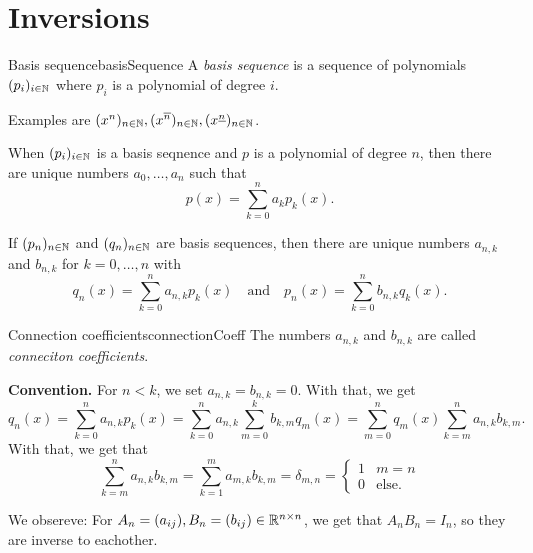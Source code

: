 \documentclass[language=english]{../../Template/TemplateLecture}
\begin{document}
\section{Inversions}
\begin{defi}{Basis sequence}{basisSequence}
    A \emph{basis sequence} is a sequence of polynomials $(p_i)_{i \in \mathbb{N}}$ where $p_i$ is a polynomial of degree $i$. 
\end{defi}

Examples are $(x^n)_{n \in \mathbb{N}}, (x^{\overline{n}})_{n \in \mathbb{N}}, (x^{\underline{n}})_{n \in \mathbb{N}}$.

When $(p_i)_{i \in \mathbb{N}}$ is a basis seqnence and $p$ is a polynomial of degree $n$, then there are unique numbers $a_0, \ldots, a_n$ such that 
\begin{equation}
    p(x) = \sum_{k = 0}^n a_k p_k(x).
\end{equation}

If $(p_n)_{n \in \mathbb{N}}$ and $(q_n)_{n \in \mathbb{N}}$ are basis sequences, then there are unique numbers $a_{n,k}
$ and $b_{n,k}$  for $k=0,\ldots,n$ with 
\begin{equation}
    q_n(x) = \sum_{k = 0}^n a_{n,k} p_k(x) \quad \text{and} \quad p_n(x) = \sum_{k = 0}^n b_{n,k} q_k(x).
\end{equation}

\begin{defi}{Connection coefficients}{connectionCoeff}
    The numbers $a_{n,k}$ and $b_{n,k}$ are called \emph{conneciton coefficients}.
\end{defi}


\textbf{Convention.} For $n < k$, we set $a_{n,k} = b_{n,k} = 0$. With that, we get 
\begin{equation}
    q_n(x) = \sum_{k = 0}^n a_{n,k} p_k(x) = \sum_{k = 0}^n a_{n,k} \sum_{m = 0}^k b_{k,m} q_m(x) = \sum_{m = 0}^n q_m(x) \sum_{k = m}^n a_{n,k} b_{k,m}. 
\end{equation}
With that, we get that 
\begin{equation}
    \sum_{k = m}^n a_{n,k} b_{k,m} = \sum_{k = 1}^m a_{m,k} b_{k,m} = \delta_{m,n} = \begin{cases}
        1 & m = n \\ 0 & \mathrm{else}.
    \end{cases}
\end{equation}

We obsereve: For $A_n = (a_{ij}), B_n = (b_{ij}) \in \mathbb{R}^{n \times n}$, we get that $A_n B_n = I_n$, so they are inverse to eachother.
\end{document}
